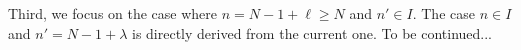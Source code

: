 \documentclass[journal, onecolumn]{IEEEtran}
\begin{document}
{Third, we focus on the case where $n=N-1+\ell\geq N$ and $n'\in I$. The case $n\in I$ and $n'=N-1+\lambda$ is directly derived from the current one.
To be continued...
%
}
\end{document}
